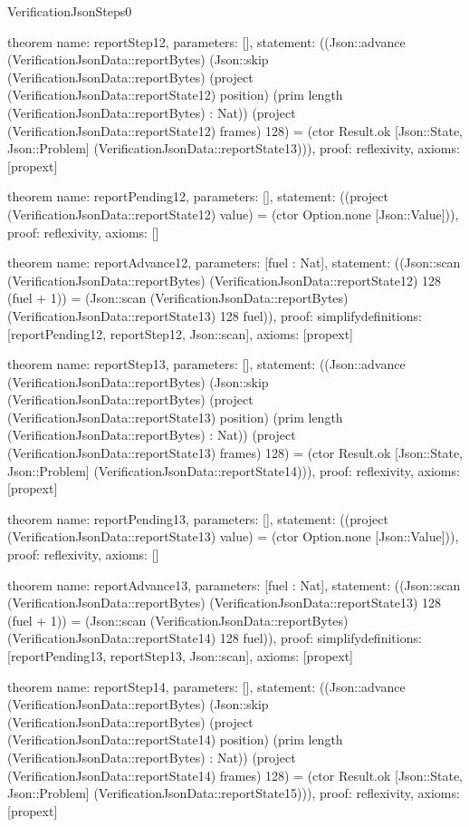 \begin{lexlean}{VerificationJsonSteps0}
\begin{semanticmodule}
theorem{
  name: reportStep12,
  parameters: [],
  statement: ((Json::advance (VerificationJsonData::reportBytes) (Json::skip (VerificationJsonData::reportBytes) (project (VerificationJsonData::reportState12) position) (prim length (VerificationJsonData::reportBytes) : Nat)) (project (VerificationJsonData::reportState12) frames) 128) = (ctor Result.ok [Json::State, Json::Problem] (VerificationJsonData::reportState13))),
  proof: reflexivity{},
  axioms: [propext]
}

theorem{
  name: reportPending12,
  parameters: [],
  statement: ((project (VerificationJsonData::reportState12) value) = (ctor Option.none [Json::Value])),
  proof: reflexivity{},
  axioms: []
}

theorem{
  name: reportAdvance12,
  parameters: [fuel : Nat],
  statement: ((Json::scan (VerificationJsonData::reportBytes) (VerificationJsonData::reportState12) 128 (fuel + 1)) = (Json::scan (VerificationJsonData::reportBytes) (VerificationJsonData::reportState13) 128 fuel)),
  proof: simplify{definitions: [reportPending12, reportStep12, Json::scan]},
  axioms: [propext]
}

theorem{
  name: reportStep13,
  parameters: [],
  statement: ((Json::advance (VerificationJsonData::reportBytes) (Json::skip (VerificationJsonData::reportBytes) (project (VerificationJsonData::reportState13) position) (prim length (VerificationJsonData::reportBytes) : Nat)) (project (VerificationJsonData::reportState13) frames) 128) = (ctor Result.ok [Json::State, Json::Problem] (VerificationJsonData::reportState14))),
  proof: reflexivity{},
  axioms: [propext]
}

theorem{
  name: reportPending13,
  parameters: [],
  statement: ((project (VerificationJsonData::reportState13) value) = (ctor Option.none [Json::Value])),
  proof: reflexivity{},
  axioms: []
}

theorem{
  name: reportAdvance13,
  parameters: [fuel : Nat],
  statement: ((Json::scan (VerificationJsonData::reportBytes) (VerificationJsonData::reportState13) 128 (fuel + 1)) = (Json::scan (VerificationJsonData::reportBytes) (VerificationJsonData::reportState14) 128 fuel)),
  proof: simplify{definitions: [reportPending13, reportStep13, Json::scan]},
  axioms: [propext]
}

theorem{
  name: reportStep14,
  parameters: [],
  statement: ((Json::advance (VerificationJsonData::reportBytes) (Json::skip (VerificationJsonData::reportBytes) (project (VerificationJsonData::reportState14) position) (prim length (VerificationJsonData::reportBytes) : Nat)) (project (VerificationJsonData::reportState14) frames) 128) = (ctor Result.ok [Json::State, Json::Problem] (VerificationJsonData::reportState15))),
  proof: reflexivity{},
  axioms: [propext]
}


\end{semanticmodule}
\end{lexlean}
